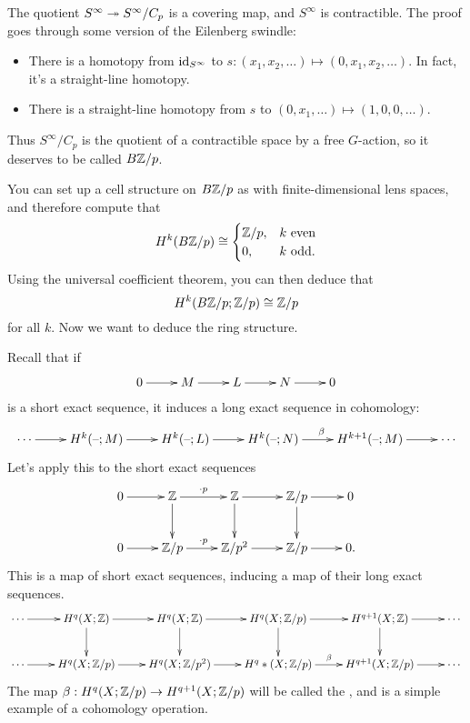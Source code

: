 The quotient $S^\infty\twoheadrightarrow S^\infty/C_p$ is a covering map, and $S^\infty$ is contractible. The proof goes through
some version of the Eilenberg swindle:
\begin{itemize}
	\item There is a homotopy from $\mathrm{id}_{S^\infty}$ to $s: (x_1,x_2,\dotsc)\mapsto (0, x_1, x_2, \dotsc)$. In fact,
	it's a straight-line homotopy.
	\item There is a straight-line homotopy from $s$ to $(0,x_1,\dotsc)\mapsto (1, 0, 0,\dotsc)$.
\end{itemize}
Thus $S^\infty/C_p$ is the quotient of a contractible space by a free $G$-action, so it deserves to be called
$B\mathbb Z/p$.

You can set up a cell structure on $B\mathbb Z/p$ as with finite-dimensional lens spaces, and therefore compute that
\[H^k(B\mathbb Z/p) \cong\begin{cases}
	\mathbb Z/p, &k\text{ even}\\
	0, &k\text{ odd.}
\end{cases}\]
Using the universal coefficient theorem, you can then deduce that
\[H^k(B\mathbb Z/p;\mathbb Z/p) \cong \mathbb Z/p\]
for all $k$. Now we want to deduce the ring structure.

Recall that if
\[\shortexact{M}{L}{N}{}\]
is a short exact sequence, it induces a long exact sequence in cohomology:
\[\xymatrix{
	\dotsb\ar[r] & H^k(\bl;M)\ar[r] &H^k(\bl;L)\ar[r] &H^k(\bl;N)\ar[r]^\beta &H^{k+1}(\bl;M)\ar[r] & \dotsb
}\]
Let's apply this to the short exact sequences
\[\xymatrix{
	0\ar[r] & \Z\ar[r]^{\cdot p}\ar[d]&\Z\ar[r]\ar[d] & \Z/p\ar[r]\ar[d] &0\\
	0\ar[r] & \Z/p\ar[r]^{\cdot p} &\Z/p^2\ar[r] & \Z/p\ar[r] &0.
}\]
This is a map of short exact sequences, inducing a map of their long exact sequences.
\begin{equation}
\gathxy{
	\dotsb\ar[r] & H^q(X;\Z)\ar[r]\ar[d] & H^q(X;\Z)\ar[r]\ar[d] & H^q(X;\Z/p)\ar[r]\ar[d] &
	H^{q+1}(X;\Z)\ar[r]\ar[d] &
	\dotsb\\
	\dotsb\ar[r] & H^q(X;\Z/p)\ar[r] & H^q(X;\Z/p^2)\ar[r] & H^q*(X;\Z/p)\ar[r]^\beta &H^{q+1}(X;\Z/p)\ar[r] &
	\dotsb
}
\end{equation}
The map $\beta:H^q(X;\mathbb Z/p)\to H^{q+1}(X;\mathbb Z/p)$ will be called the , and is a simple
example of a cohomology operation.

